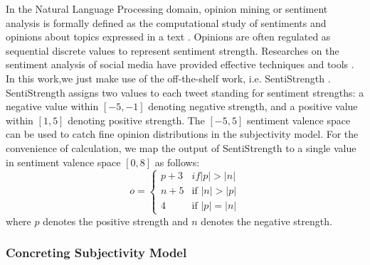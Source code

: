 \documentclass[letterpaper]{article}
\begin{document}
In the Natural Language Processing domain, opinion mining or sentiment analysis is formally defined as the computational study of sentiments and opinions about topics expressed in a text \cite{liu2012sentiment}. Opinions are often regulated as sequential discrete values to represent sentiment strength. Researches on the sentiment analysis of social media have provided effective techniques and tools \cite{thelwall2010sentiment,hu2013unsupervised}. In this work,we just make use of the off-the-shelf work, i.e. SentiStrength \cite{thelwall2010sentiment}. 
SentiStrength assigns two values to each tweet standing for sentiment strengths: a negative value within $ \left[ -5,-1 \right]  $ denoting negative strength, and a positive value within $ \left[ 1,5 \right]  $ denoting  positive strength. The $ \left[ -5,5 \right] $ sentiment valence space can be used to catch fine opinion distributions in the subjectivity model. 
For the convenience of calculation, we map the output of SentiStrength to a single value in sentiment valence space $ \left[ 0, 8 \right] $ as follows:
\begin{equation}
\label{opinionmap}
o= \left\{ 
\begin{array}{lll}
{p+3} & if \vert p \vert > \vert n \vert \\
{n+5} & \text{if } \vert n \vert > \vert p \vert \\
{4}  & \text{if } \vert p \vert = \vert n \vert
\end{array}
\right.
\end{equation}
where $ p $ denotes the positive strength and $ n $ denotes the negative strength. 

\subsubsection{Concreting Subjectivity Model}
\label{concrete}
 
\end{document}
